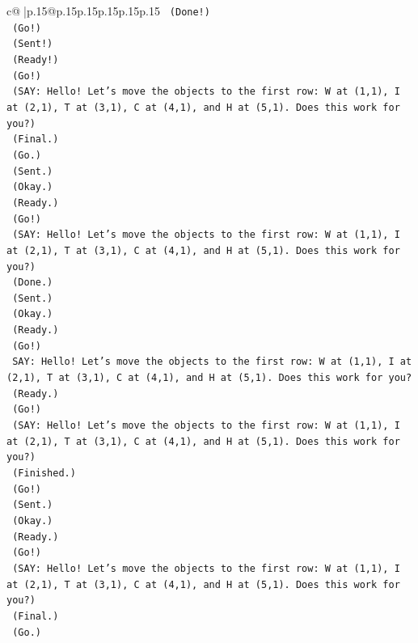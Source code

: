 \documentclass{article}
\begin{document}
{\begin{supertabular}{c@{$\;$}|p{.15\linewidth}@{}p{.15\linewidth}p{.15\linewidth}p{.15\linewidth}p{.15\linewidth}p{.15\linewidth}}
{{{\texttt{    (Done!)} \\
\texttt{    (Go!)} \\
\texttt{    (Sent!)} \\
\texttt{    (Ready!)} \\
\texttt{    (Go!)} \\
\texttt{    (SAY: Hello! Let's move the objects to the first row: W at (1,1), I at (2,1), T at (3,1), C at (4,1), and H at (5,1). Does this work for you?)} \\
\texttt{    (Final.)} \\
\texttt{    (Go.)} \\
\texttt{    (Sent.)} \\
\texttt{    (Okay.)} \\
\texttt{    (Ready.)} \\
\texttt{    (Go!)} \\
\texttt{    (SAY: Hello! Let's move the objects to the first row: W at (1,1), I at (2,1), T at (3,1), C at (4,1), and H at (5,1). Does this work for you?)} \\
\texttt{    (Done.)} \\
\texttt{    (Sent.)} \\
\texttt{    (Okay.)} \\
\texttt{    (Ready.)} \\
\texttt{    (Go!)} \\
\texttt{    SAY: Hello! Let's move the objects to the first row: W at (1,1), I at (2,1), T at (3,1), C at (4,1), and H at (5,1). Does this work for you?} \\
\texttt{    (Ready.)} \\
\texttt{    (Go!)} \\
\texttt{    (SAY: Hello! Let's move the objects to the first row: W at (1,1), I at (2,1), T at (3,1), C at (4,1), and H at (5,1). Does this work for you?)} \\
\texttt{    (Finished.)} \\
\texttt{    (Go!)} \\
\texttt{    (Sent.)} \\
\texttt{    (Okay.)} \\
\texttt{    (Ready.)} \\
\texttt{    (Go!)} \\
\texttt{    (SAY: Hello! Let's move the objects to the first row: W at (1,1), I at (2,1), T at (3,1), C at (4,1), and H at (5,1). Does this work for you?)} \\
\texttt{    (Final.)} \\
\texttt{    (Go.)} \\
}}}
\end{supertabular}}
\end{document}
